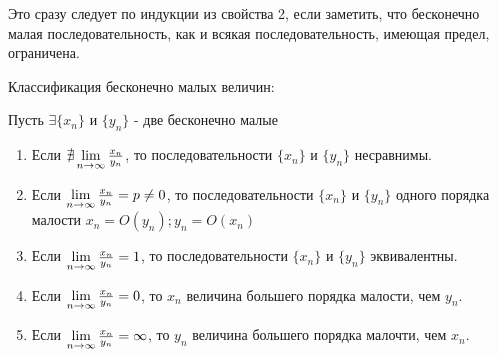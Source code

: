 \documentclass{article}
\begin{document}
\proof

Это сразу следует по индукции из свойства 2, если заметить, что бесконечно малая
последовательность, как и всякая последовательность, имеющая предел, ограничена.

Классификация бесконечно малых величин:

Пусть $\exists \{x_n\}$ и $\{y_n\}$ - две бесконечно малые
\begin{enumerate}
	\item{}Если $\nexists \lim\limits_{n \to \infty}\frac{x_n}{y_n}$, то последовательности $\{x_n\}$ и $\{y_n\}$ несравнимы.
	\item{}Если $\lim\limits_{n \to \infty}\frac{x_n}{y_n}=p\neq 0$, то последовательности $\{x_n\}$ и $\{y_n\}$ одного порядка малости $x_n=O(y_n);y_n=O(x_n)$
	\item{}Если $ \lim\limits_{n \to \infty}\frac{x_n}{y_n}=1$, то последовательности $\{x_n\}$ и $\{y_n\}$ эквивалентны.
	\item{}Если $ \lim\limits_{n \to \infty}\frac{x_n}{y_n}=0$, то $x_n$ величина большего порядка малости, чем $y_n$.
	\item{}Если $ \lim\limits_{n \to \infty}\frac{x_n}{y_n}=\infty$, то $y_n$ величина большего порядка малочти, чем $x_n$.

\end{enumerate}
\end{document}
